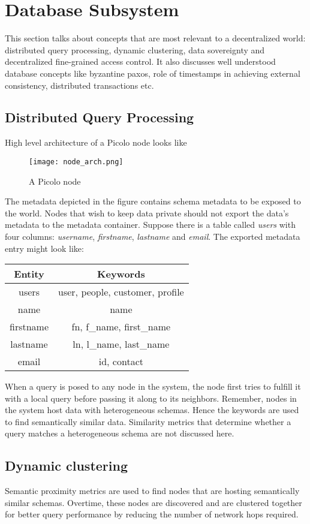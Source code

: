 \section{Database Subsystem}
This section talks about concepts that are most relevant to a decentralized world: distributed query processing, dynamic clustering, data sovereignty and decentralized fine-grained access control. It also discusses well understood database concepts like byzantine paxos, role of timestamps in achieving external consistency, distributed transactions etc.
\subsection{Distributed Query Processing} High level architecture of a Picolo node looks like 
\begin{figure}[h!] \centering
	\texttt{[image: node\_arch.png]}
	\caption{A Picolo node}
	\label{fig:node_arch}
\end{figure}
The metadata depicted in the figure contains schema metadata to be exposed to the world. Nodes that wish to keep data private should not export the data's metadata to the metadata container. Suppose there is a table called \textit{users} with four columns: \textit{username}, \textit{firstname}, \textit{lastname} and \textit{email}. The exported metadata entry might look like:
\begin{center}
	\begin{tabular}{| c | c |} 
		\hline
		Entity & Keywords \\ [0.5ex] 
		\hline
		users & user, people, customer, profile\\ 
		\hline
		name & name \\
		\hline
		firstname & fn, {f\_name}, {first\_name} \\
		\hline
		lastname & ln, {l\_name}, {last\_name} \\
		\hline
		email & id, contact \\ [1ex] 
		\hline
	\end{tabular}
\end{center}
When a query is posed to any node in the system, the node first tries to fulfill it with a local query before passing it along to its neighbors. Remember, nodes in the system host data with heterogeneous schemas. Hence the keywords are used to find semantically similar data. Similarity metrics that determine whether a query matches a heterogeneous schema are not discussed here.
\subsection{Dynamic clustering}
Semantic proximity metrics are used to find nodes that are hosting semantically similar schemas. Overtime, these nodes are discovered and are clustered together for better query performance by reducing the number of network hops required.
